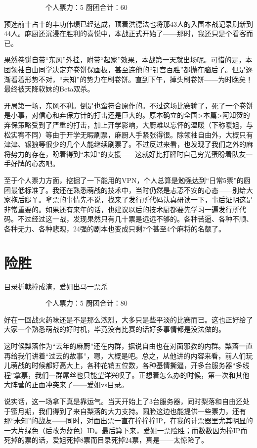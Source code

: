 　　　　　　个人票力：5 厨团合计：60

预选前十占十的丰功伟绩已经达成，顶着洪德法也将那43人的入围本战记录刷新到44人。麻厨还沉浸在胜利的喜悦中，本战正式开始了——那时，我还只是个看客而已。

果然卷饼自带“东风”外挂，附带“起家”效果，本战第一天就出场呢。可惜的是，本团领袖自由同学决定弃卷饼保画板，甚至连他的“钉宫百胜”都抛在脑后了。但是逐渐看着形势不对，“未知”的势力在刷卷饼。直到下午，掉头刷卷饼——为时晚矣！最终被天降软妹的Beta双杀。

开局第一场，东风不利。倒是也蛮符合原作的。不过这场比赛输了，死了一个卷饼是小事，对信心和弃保方针的打击还是巨大的。原本确立的全国>本篇>阿知贺的弃保策略受到了严重的打击，加上开学影响，大厨难以忘怀的温暖（下称暖姐，与松实宥不同）等由于开学无暇刷票，麻厨人手紧张得很。除领袖自由外，大概只有津津、银狼等很少的几个人能继续刷票了。不过反过来看，也发现了我们之外的麻将势力的存在，盼着得到“未知”的支援——这就好比打牌时自己穷光蛋盼着队友一手好牌的心态吧。

至于个人票力方面，挖掘了一下能用的VPN，个人总算是勉强达到“日常5票”的厨团最低标准了。我还在熟悉萌战的技术中，当时仍然是忐忑不安的心态——别给大家拖后腿丫。拿票的事情先不说，找来了发行所代码认真研读一下，事后证明这是非常重要的。如果还有来年的话，也建议以后的技术厨都要先学习一遍发行所代码。不过经过这一战，发现果然只有几十票是远远不够的。各种苦逼、各种不顺、各种无力、各种悲观，24强的剧本也变成只剩7个甚至4个麻将的名额了。


\section{险胜}
目录折戟撞成渣，爱姐出马一票杀

　　　　　　个人票力：5 厨团合计：80

好在一回战火药味还是不是那么浓烈，大多只是些平淡的比赛而已。这也正好给了大家一个熟悉萌战的好时机，毕竟没有比赛的话好多事情都是没法做的。

这时候梨落作为“去年的麻厨”还在内群，据说自由也在对面邪教的内群。梨落一直再给我们讲着“过去的故事”，嗯，大概是吧。总之，从他讲的内容来看，前人们玩儿萌战的时候都好高大上，各种花销五位数，各种基情撕逼，开多台服务器“多线程”拿票，我们一群屌丝也只能望洋兴叹了。正想着怎么办的时候，第一次和其他大阵营的正面冲突来了——爱姐vs目录。

说实话，这一场拿下真是靠运气。当天开始上了3台服务器，同时梨落和自由还处于蜜月期，我们得到了来自梨落的大力支持。圆脸这边也能提供一些票力，还有那“未知”的战友——同时，对面出票一直在撞撞撞IP，在我的计票器里尤其明显的一大片绿色（后改为蓝色）ID。最后算下来，爱姐一票险胜；而数数因为撞IP而死掉的票的话，爱姐死掉8票而目录死掉24票，真是——太惊险了。

